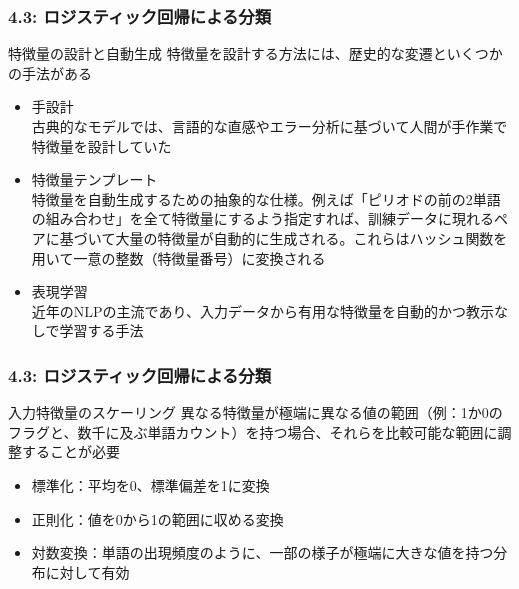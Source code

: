 \documentclass[unicode,11pt]{beamer} %
\begin{document}
\begin{frame}
    \frametitle{4.3: ロジスティック回帰による分類}
    \begin{alertblock}{特徴量の設計と自動生成}
        特徴量を設計する方法には、歴史的な変遷といくつかの手法がある
        \begin{itemize}
            \item 手設計\\古典的なモデルでは、言語的な直感やエラー分析に基づいて人間が手作業で特徴量を設計していた
            \item 特徴量テンプレート\\特徴量を自動生成するための抽象的な仕様。例えば「ピリオドの前の2単語の組み合わせ」を全て特徴量にするよう指定すれば、訓練データに現れるペアに基づいて大量の特徴量が自動的に生成される。これらはハッシュ関数を用いて一意の整数（特徴量番号）に変換される
            \item 表現学習\\近年のNLPの主流であり、入力データから有用な特徴量を自動的かつ教示なしで学習する手法
        \end{itemize}
    \end{alertblock}
\end{frame}

\begin{frame}
    \frametitle{4.3: ロジスティック回帰による分類}
    \begin{alertblock}{入力特徴量のスケーリング}
        異なる特徴量が極端に異なる値の範囲（例：1か0のフラグと、数千に及ぶ単語カウント）を持つ場合、それらを比較可能な範囲に調整することが必要
        \begin{itemize}
            \item 標準化：平均を0、標準偏差を1に変換
            \item 正則化：値を0から1の範囲に収める変換
            \item 対数変換：単語の出現頻度のように、一部の様子が極端に大きな値を持つ分布に対して有効
        \end{itemize}
    \end{alertblock}
\end{frame}
\end{document}
